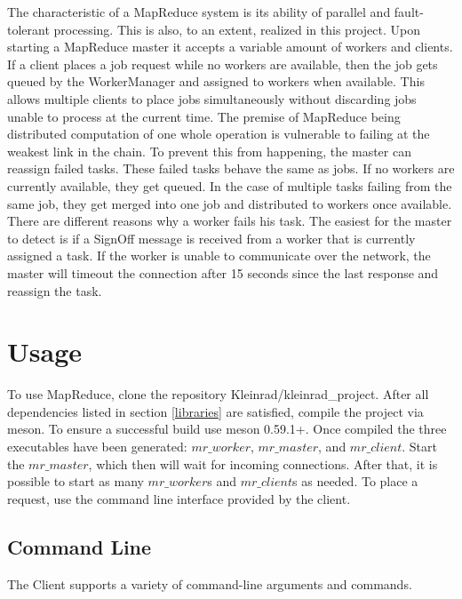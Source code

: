 \documentclass[12pt, letterpaper]{article}
\begin{document}
The characteristic of a MapReduce system is its ability of parallel and fault-tolerant processing. This is also, to an extent, realized in this project.\newline
Upon starting a MapReduce master it accepts a variable amount of workers and clients. If a client places a job request while no workers are available, then the job gets queued by the WorkerManager and assigned to workers when available. This allows multiple clients to place jobs simultaneously without discarding jobs unable to process at the current time.\newline
The premise of MapReduce being distributed computation of one whole operation is vulnerable to failing at the weakest link in the chain. To prevent this from happening, the master can reassign failed tasks. These failed tasks behave the same as jobs. If no workers are currently available, they get queued. In the case of multiple tasks failing from the same job, they get merged into one job and distributed to workers once available.\newline
There are different reasons why a worker fails his task. The easiest for the master to detect is if a SignOff message is received from a worker that is currently assigned a task. If the worker is unable to communicate over the network, the master will timeout the connection after 15 seconds since the last response and reassign the task. 

\section{Usage}
\label{usage}

To use MapReduce, clone the repository Kleinrad/kleinrad\_project. After all dependencies listed in section \ref{libraries} are satisfied, compile the project via meson. To ensure a successful build use meson 0.59.1+. Once compiled the three executables have been generated: $mr\_worker$, $mr\_master$, and $mr\_client$.\newline
Start the $mr\_master$, which then will wait for incoming connections. After that, it is possible to start as many $mr\_worker$s and $mr\_client$s as needed. To place a request, use the command line interface provided by the client.

\pagebreak
\subsection{Command Line}
The Client supports a variety of command-line arguments and commands.
\end{document}
